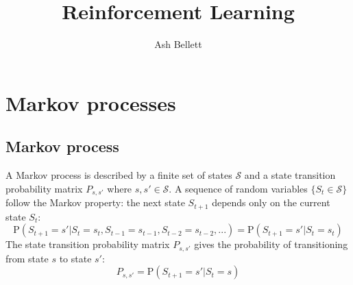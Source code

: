 \documentclass{article}
\title{\textbf{Reinforcement Learning}}
\author{Ash Bellett}
\date{}
\begin{document}
\clearpage
\maketitle
\thispagestyle{empty}
\setcounter{page}{0}
\newpage

\section{Markov processes}

\subsection{Markov process}
A Markov process is described by a finite set of states $ \mathcal{S} $ and a state transition probability matrix $ P_{s,s'} $ where $ s, s' \in \mathcal{S} $. A sequence of random variables $ \{S_t \in \mathcal{S} \} $ follow the Markov property: the next state $ S_{t+1} $ depends only on the current state $ S_t $:
\[ \text{P}(S_{t+1} = s' | S_t = s_t, S_{t-1} = s_{t-1}, S_{t-2} = s_{t-2}, ...) = \text{P}(S_{t+1} = s' | S_t = s_t) \]
The state transition probability matrix $ P_{s,s'} $ gives the probability of transitioning from state $ s $ to state $ s' $:
\[ P_{s,s'} = \text{P}(S_{t+1} = s' | S_t = s) \]
\end{document}
